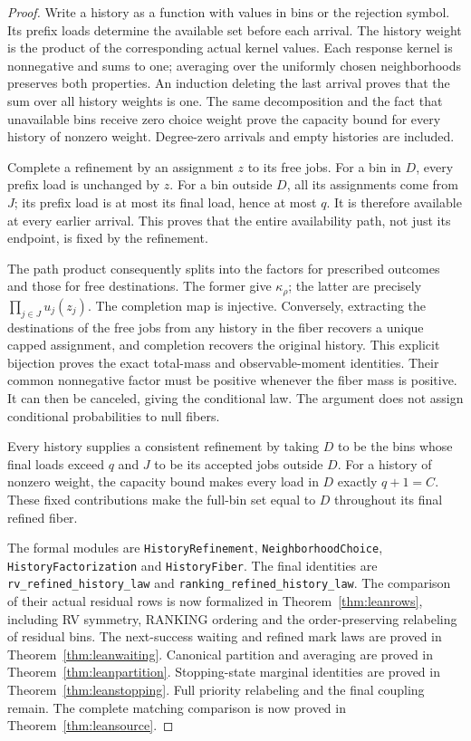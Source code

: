 \documentclass[11pt]{article}
\begin{document}
\begin{proof}
Write a history as a function with values in bins or the rejection
symbol. Its prefix loads determine the available set before each arrival.
The history weight is the product of the corresponding actual kernel
values. Each response kernel is nonnegative and sums to one; averaging
over the uniformly chosen neighborhoods preserves both properties. An
induction deleting the last arrival proves that the sum over all history
weights is one. The same decomposition and the fact that unavailable
bins receive zero choice weight prove the capacity bound for every
history of nonzero weight. Degree-zero arrivals and empty histories are
included.

Complete a refinement by an assignment $z$ to its free jobs. For a bin
in $D$, every prefix load is unchanged by $z$. For a bin outside $D$,
all its assignments come from $J$; its prefix load is at most its final
load, hence at most $q$. It is therefore available at every earlier
arrival. This proves that the entire availability path, not just its
endpoint, is fixed by the refinement.

The path product consequently splits into the factors for prescribed
outcomes and those for free destinations. The former give
$\kappa_\rho$; the latter are precisely $\prod_{j\in J}u_j(z_j)$.
The completion map is injective. Conversely, extracting the destinations
of the free jobs from any history in the fiber recovers a unique capped
assignment, and completion recovers the original history. This explicit
bijection proves the exact total-mass and observable-moment identities.
Their common nonnegative factor must be positive whenever the fiber
mass is positive. It can then be canceled, giving the conditional law.
The argument does not assign conditional probabilities to null fibers.

Every history supplies a consistent refinement by taking $D$ to be the
bins whose final loads exceed $q$ and $J$ to be its accepted jobs outside
$D$. For a history of nonzero weight, the capacity bound makes every
load in $D$ exactly $q+1=C$. These fixed contributions make the full-bin
set equal to $D$ throughout its final refined fiber.

The formal modules are \texttt{HistoryRefinement},
\texttt{NeighborhoodChoice}, \texttt{HistoryFactorization} and
\texttt{HistoryFiber}. The final identities are
\texttt{rv\_refined\_history\_law} and
\texttt{ranking\_refined\_history\_law}. The comparison of their actual
residual rows is now formalized in Theorem~\ref{thm:leanrows}, including
RV symmetry, RANKING ordering and the order-preserving relabeling of
residual bins.
The next-success waiting and refined mark laws are proved in
Theorem~\ref{thm:leanwaiting}. Canonical partition and averaging are
proved in Theorem~\ref{thm:leanpartition}. Stopping-state marginal
identities are proved in Theorem~\ref{thm:leanstopping}. Full priority
relabeling and the final coupling remain.
The complete matching comparison is now proved in Theorem~\ref{thm:leansource}.
\end{proof}
\end{document}
